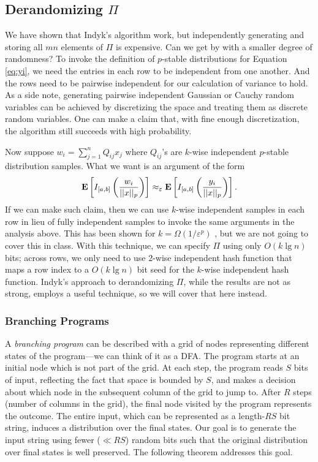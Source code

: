 \documentclass[11pt]{article}
\newcommand{\eps}{\varepsilon}
\begin{document}
\subsection{Derandomizing $\Pi$}

We have shown that Indyk's algorithm work, but independently generating and storing all $mn$ elements of $\Pi$ is expensive. Can we get by with a smaller degree of randomness? To invoke the definition of $p$-stable distributions for Equation \ref{eq:yi}, we need the entries in each row to be independent from one another. And the rows need to be pairwise independent for our calculation of variance to hold. As a side note, generating pairwise independent Gaussian or Cauchy random variables can be achieved by discretizing the space and treating them as discrete random variables. One can make a claim that, with fine enough discretization, the algorithm still succeeds with high probability.

Now suppose $w_{i}=\sum_{j=1}^n Q_{ij}x_{j}$ where $Q_{ij}$'s are $k$-wise independent $p$-stable distribution samples. What we want is an argument of the form 
\begin{equation}
\mathbf{E} \ppp{I_{[a,b]}\pp{\frac{w_{i}}{||x||_{p}}}} \approx_{\eps} \mathbf{E} \ppp{I_{[a,b]}\pp{\frac{y_{i}}{||x||_{p}}}}.
\end{equation}
If we can make such claim, then we can use $k$-wise independent samples in each row in lieu of fully independent samples to invoke the same arguments in the analysis above. This has been shown for $k=\Omega(1/\eps^{p})$ \cite{KNW10}, but we are not going to cover this in class. With this technique, we can specify $\Pi$ using only $O(k\lg n)$ bits; across rows, we only need to use 2-wise independent hash function that maps a row index to a $O(k\lg n)$ bit seed for the $k$-wise independent hash function. Indyk's approach to derandomizing $\Pi$, while the results are not as strong, employs a useful technique, so we will cover that here instead.

\subsubsection{Branching Programs}

A {\em branching program} can be described with a grid of nodes representing different states of the program---we can think of it as a DFA. The program starts at an initial node which is not part of the grid. At each step, the program reads $S$ bits of input, reflecting the fact that space is bounded by $S$, and makes a decision about which node in the subsequent column of the grid to jump to. After $R$ steps (number of columns in the grid), the final node visited by the program represents the outcome. The entire input, which can be represented as a length-$RS$ bit string, induces a distribution over the final states. Our goal is to generate the input string using fewer ($\ll RS$) random bits such that the original distribution over final states is well preserved. The following theorem addresses this goal.
\end{document}
